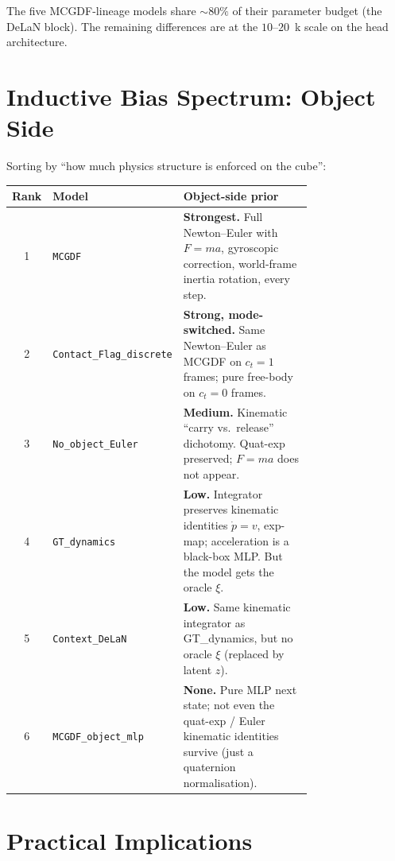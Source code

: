 \documentclass[11pt]{article}
\begin{document}
The five MCGDF-lineage models share $\sim 80\%$ of their parameter
budget (the DeLaN block).  The remaining differences are at the
$10$--$20$~k scale on the head architecture.

\section{Inductive Bias Spectrum: Object Side}

Sorting by ``how much physics structure is enforced on the cube'':

\begin{center}
\small
\begin{tabular}{c p{0.20\linewidth} p{0.55\linewidth}}
\toprule
Rank & Model & Object-side prior \\
\midrule
1 & \texttt{MCGDF}                   & \textbf{Strongest.}  Full Newton--Euler with $F=ma$, gyroscopic correction, world-frame inertia rotation, every step. \\
2 & \texttt{Contact\_Flag\_discrete} & \textbf{Strong, mode-switched.}  Same Newton--Euler as MCGDF on $c_t = 1$ frames; pure free-body on $c_t = 0$ frames. \\
3 & \texttt{No\_object\_Euler}       & \textbf{Medium.}  Kinematic ``carry vs.\ release'' dichotomy.  Quat-exp preserved; $F=ma$ does not appear. \\
4 & \texttt{GT\_dynamics}            & \textbf{Low.}  Integrator preserves kinematic identities $\dot p = v$, exp-map; acceleration is a black-box MLP.  But the model gets the oracle $\xi$. \\
5 & \texttt{Context\_DeLaN}          & \textbf{Low.}  Same kinematic integrator as GT\_dynamics, but no oracle $\xi$ (replaced by latent $z$). \\
6 & \texttt{MCGDF\_object\_mlp}      & \textbf{None.}  Pure MLP next state; not even the quat-exp / Euler kinematic identities survive (just a quaternion normalisation). \\
\bottomrule
\end{tabular}
\end{center}

\section{Practical Implications}
\end{document}
